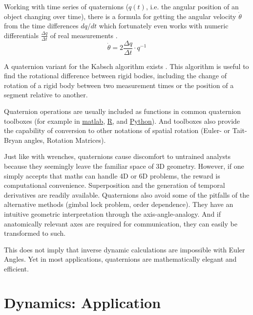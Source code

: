 Working with time series of quaternions (\(q(t)\), i.e. the angular position of an object changing over time), there is a formula for getting the angular velocity \(\dot \theta\) from the time differences \(dq/dt\) which fortunately even works with numeric differentials \(\frac{\Delta q}{\Delta t}\) of real measurements \citep{Baker1999}.
\[\dot \theta = 2 \frac{\Delta q}{\Delta t} \cdot q^{-1} \]

A quaternion variant for the Kabsch algorithm exists \citep{Kabsch1976,Lawrence2019,Kneller1991}.
This algorithm is useful to find the rotational difference between rigid bodies, including the change of rotation of a rigid body between two measurement times or the position of a segment relative to another.


Quaternion operations are usually included as functions in common quaternion toolboxes (for example in \href{https://www.mathworks.com/discovery/quaternion.html}{matlab}, \href{https://cran.r-project.org/web/packages/onion/onion.pdf}{R}, and \href{https://pypi.org/project/numpy-quaternion}{Python}).
And toolboxes also provide the capability of conversion to other notations of spatial rotation (Euler- or Tait-Bryan angles, Rotation Matrices).


Just like with wrenches, quaternions cause discomfort to untrained analysts because they seemingly leave the familiar space of 3D geometry.
However, if one simply accepts that maths can handle 4D or 6D problems, the reward is computational convenience.
Superposition and the generation of temporal derivatives are readily available.
Quaternions also avoid some of the pitfalls of the alternative methods (gimbal lock problem, order dependence).
They have an intuitive geometric interpretation through the axis-angle-analogy.
And if anatomically relevant axes are required for communication, they can easily be transformed to such.

This does not imply that inverse dynamic calculations are impossible with Euler Angles.
Yet in most applications, quaternions are mathematically elegant and efficient.


\section{Dynamics: Application}
\label{sec:org4e4fe5c}

